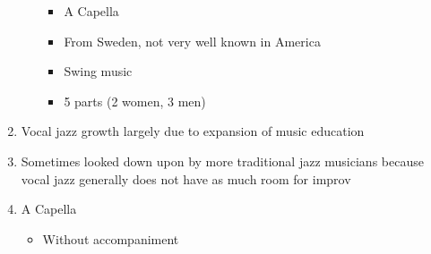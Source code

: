 \documentclass[]{article}
\providecommand{\tightlist}{%
  \setlength{\itemsep}{0pt}\setlength{\parskip}{0pt}}
\begin{document}
\begin{enumerate}
\begin{itemize}
    \begin{itemize}
    \tightlist
    \item
      A Capella
    \item
      From Sweden, not very well known in America
    \item
      Swing music
    \item
      5 parts (2 women, 3 men)
    \end{itemize}
  \end{itemize}
\item
  Vocal jazz growth largely due to expansion of music education
\item
  Sometimes looked down upon by more traditional jazz musicians because
  vocal jazz generally does not have as much room for improv
\item
  A Capella

  \begin{itemize}
  \tightlist
  \item
    Without accompaniment
  \end{itemize}
\end{enumerate}
\end{document}

